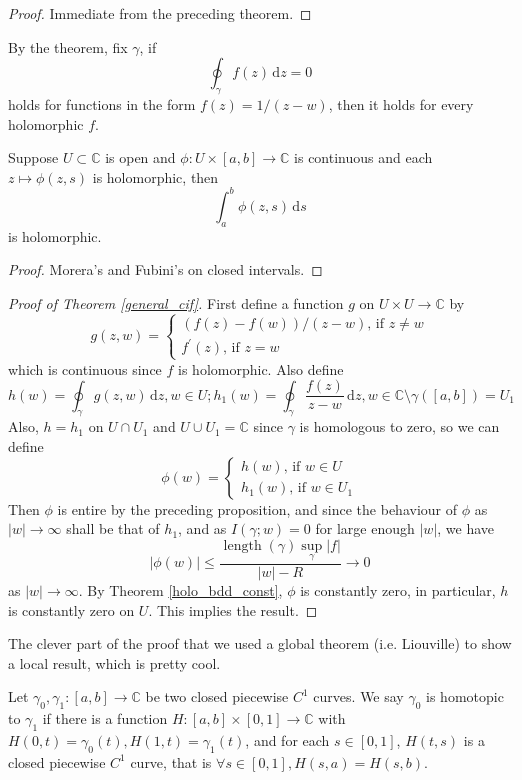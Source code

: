 \begin{proof}
    Immediate from the preceding theorem.
\end{proof}
\begin{remark}
    By the theorem, fix $\gamma$, if
    $$\oint_\gamma f(z)\,\mathrm dz=0$$
    holds for functions in the form $f(z)=1/(z-w)$, then it holds for every holomorphic $f$.
\end{remark}
\begin{proposition}
    Suppose $U\subset\mathbb C$ is open and $\phi:U\times [a,b]\to\mathbb C$ is continuous and each $z\mapsto \phi(z,s)$ is holomorphic, then
    $$\int_a^b\phi(z,s)\,\mathrm ds$$
    is holomorphic.
\end{proposition}
\begin{proof}
    Morera's and Fubini's on closed intervals.
\end{proof}
\begin{proof}[Proof of Theorem \ref{general_cif}]
    First define a function $g$ on $U\times U\to\mathbb C$ by
    $$g(z,w)=\begin{cases}
        (f(z)-f(w))/(z-w)\text{, if $z\neq w$}\\
        f^\prime(z)\text{, if $z=w$}
    \end{cases}$$
    which is continuous since $f$ is holomorphic.
    Also define
    $$h(w)=\oint_\gamma g(z,w)\,\mathrm dz,w\in U;h_1(w)=\oint_\gamma\frac{f(z)}{z-w}\,\mathrm dz,w\in\mathbb C\setminus\gamma([a,b])=U_1$$
    Also, $h=h_1$ on $U\cap U_1$ and $U\cup U_1=\mathbb C$ since $\gamma$ is homologous to zero, so we can define
    $$\phi(w)=\begin{cases}
        h(w)\text{, if $w\in U$}\\
        h_1(w)\text{, if $w\in U_1$}
    \end{cases}$$
    Then $\phi$ is entire by the preceding proposition, and since the behaviour of $\phi$ as $|w|\to\infty$ shall be that of $h_1$, and as $I(\gamma;w)=0$ for large enough $|w|$, we have
    $$|\phi(w)|\le\frac{\operatorname{length}(\gamma)\sup_\gamma|f|}{|w|-R}\to 0$$
    as $|w|\to\infty$.
    By Theorem \ref{holo_bdd_const}, $\phi$ is constantly zero, in particular, $h$ is constantly zero on $U$.
    This implies the result.
\end{proof}
The clever part of the proof that we used a global theorem (i.e. Liouville) to show a local result, which is pretty cool.
\begin{definition}
    Let $\gamma_0,\gamma_1:[a,b]\to\mathbb C$ be two closed piecewise $C^1$ curves.
    We say $\gamma_0$ is homotopic to $\gamma_1$ if there is a function $H:[a,b]\times [0,1]\to\mathbb C$ with $H(0,t)=\gamma_0(t),H(1,t)=\gamma_1(t)$, and for each $s\in [0,1]$, $H(t,s)$ is a closed piecewise $C^1$ curve, that is $\forall s\in[0,1],H(s,a)=H(s,b)$.
\end{definition}
